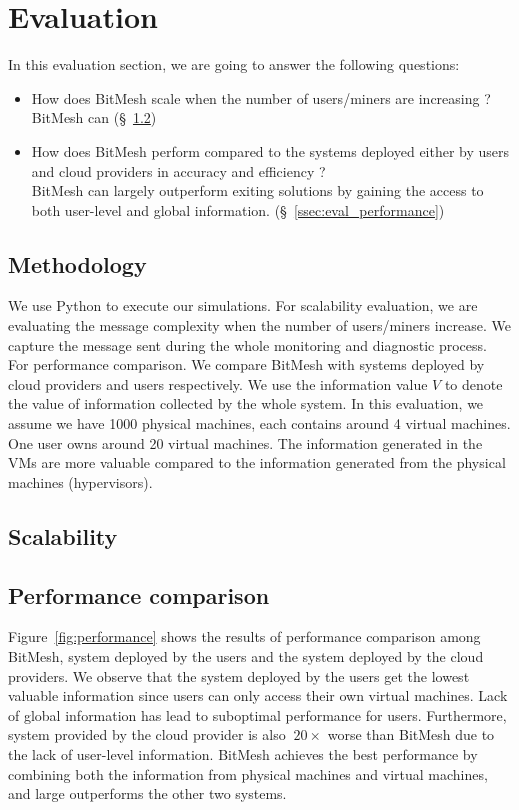 \documentclass[11px]{article}
\newcommand{\projTitle}{BitMesh\xspace}
\begin{document}
\section{Evaluation}
In this evaluation section, we are going to answer the following questions:

\begin{itemize}
  \item How does \projTitle scale when the number of users/miners are increasing ? \\
      \projTitle can (\S~\ref{ssec:eval_scalability})
  \item How does \projTitle perform compared to the systems deployed either by users and cloud providers in accuracy and efficiency ? \\
      \projTitle can largely outperform exiting solutions by gaining the access to both user-level and global information. (\S~\ref{ssec:eval_performance})
\end{itemize}

\subsection{Methodology}
We use Python to execute our simulations. For scalability evaluation, we are evaluating the message complexity when the number of users/miners increase. We capture the message sent during the whole monitoring and diagnostic process. For performance comparison. We compare \projTitle with systems deployed by cloud providers and users respectively. We use the information value $V$ to denote the value of information collected by the whole system. In this evaluation, we assume we have 1000 physical machines, each contains around 4 virtual machines. One user owns around 20 virtual machines. The information generated in the VMs are more valuable compared to the information generated from the physical machines (hypervisors).

\subsection{Scalability}
\label{ssec:eval_scalability}

\subsection{Performance comparison}
Figure~\ref{fig:performance} shows the results of performance comparison among \projTitle, system deployed by the users and the system deployed by the cloud providers. We observe that the system deployed by the users get the lowest valuable information since users can only access their own virtual machines. Lack of global information has lead to suboptimal performance for users. Furthermore, system provided by the cloud provider is also $~20\times$ worse than \projTitle due to the lack of user-level information. \projTitle achieves the best performance by combining both the information from physical machines and virtual machines, and large outperforms the other two systems.
\end{document}
